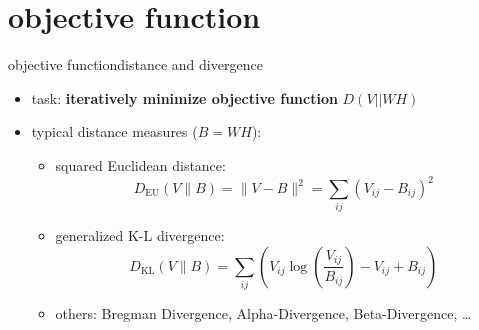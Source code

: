     \section[objective function]{objective function}
        \begin{frame}{objective function}{distance and divergence}
            \vspace{-2mm}
            \begin{itemize}
                \item   task: \textbf{iteratively minimize objective function} $D(V || WH)$
                \bigskip
                \item   typical distance measures ($B = WH$):
                   \begin{itemize}
                        \item  squared Euclidean distance:\\
                        \begin{equation*}
                        D_\mathrm{EU}( V \parallel B) = \parallel V - B\parallel^{2} = \sum_{i j} (V_{i j} - B_{i j})^{2}
                        \end{equation*}
                       \item  generalized K-L divergence:\\
                       \begin{equation*}
                        D_\mathrm{KL}( V \parallel B) = \sum_{i j} (V_{i j} \log\left(\frac{V_{i j}}{B_{i j}}\right) - V_{i j} + B_{i j})
                        \end{equation*}		                
                        \smallskip
                        \item<2-> others: Bregman Divergence, Alpha-Divergence, Beta-Divergence, \ldots 
                   \end{itemize}
            \end{itemize}
        
        \end{frame}          
    
